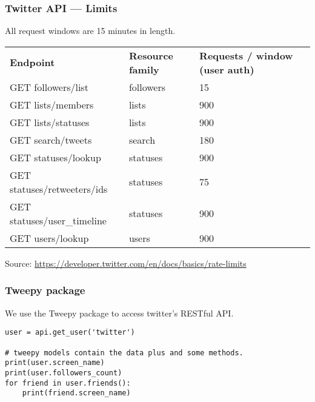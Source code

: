 \begin{frame}
    \frametitle{Twitter API --- Limits}

    All request windows are 15 minutes in length.

    \begin{table}[]
        \footnotesize
        \begin{tabular}{llll}
          \textbf{Endpoint}           & \textbf{Resource family} & \textbf{Requests / window (user auth)} \\
          GET followers/list          & followers                & 15                                     \\
          GET lists/members           & lists                    & 900                                    \\
          GET lists/statuses          & lists                    & 900                                    \\
          GET search/tweets           & search                   & 180                                    \\
          GET statuses/lookup         & statuses                 & 900                                    \\
          GET statuses/retweeters/ids & statuses                 & 75                                     \\
          GET statuses/user\_timeline & statuses                 & 900                                    \\
          GET users/lookup            & users                    & 900                                    \\
        \end{tabular}
    \end{table}

    Source: \href{https://developer.twitter.com/en/docs/basics/rate-limits}{https://developer.twitter.com/en/docs/basics/rate-limits}

\end{frame}

\begin{frame}[fragile]
    \frametitle{Tweepy package}

    We use the Tweepy package to access twitter's RESTful API.

\begin{verbatim}
user = api.get_user('twitter')

# tweepy models contain the data plus and some methods.
print(user.screen_name)
print(user.followers_count)
for friend in user.friends():
    print(friend.screen_name)
\end{verbatim}

\end{frame}

